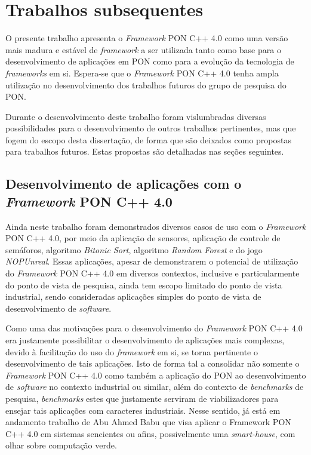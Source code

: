 \section{Trabalhos subsequentes}\label{sec:futuro}

O presente trabalho apresenta o \textit{Framework} PON C++ 4.0 como
uma versão mais madura e estável de \textit{framework} a ser utilizada tanto
como base para o desenvolvimento de aplicações em PON como para a evolução da
tecnologia de \textit{frameworks} em si. Espera-se que o
\textit{Framework} PON C++ 4.0 tenha ampla utilização no
desenvolvimento dos trabalhos futuros do grupo de pesquisa do PON.

Durante o desenvolvimento deste trabalho foram vislumbradas diversas
possibilidades para o desenvolvimento de outros trabalhos pertinentes, mas que
fogem do escopo desta dissertação, de forma que são deixados como propostas para
trabalhos futuros. Estas propostas são detalhadas nas seções seguintes.

\subsection{Desenvolvimento de aplicações com o \textit{Framework} PON C++ 4.0}

Ainda neste trabalho foram demonstrados diversos casos de uso com o
\textit{Framework} PON C++ 4.0, por meio da aplicação de sensores, aplicação de
controle de semáforos, algoritmo \textit{Bitonic Sort}, algoritmo \textit{Random
Forest} e do jogo \textit{NOPUnreal}. Essas aplicações, apesar de demonstrarem o
potencial de utilização do \textit{Framework} PON C++ 4.0 em diversos contextos,
inclusive e particularmente do ponto de vista de pesquisa, ainda tem escopo
limitado do ponto de vista industrial, sendo consideradas aplicações simples do
ponto de vista de desenvolvimento de \textit{software}.

Como uma das motivações para o desenvolvimento do \textit{Framework} PON C++ 4.0
era justamente possibilitar o desenvolvimento de aplicações mais complexas,
devido à facilitação do uso do \textit{framework} em si, se torna pertinente o
desenvolvimento de tais aplicações. Isto de forma tal a consolidar não somente o
\textit{Framework} PON C++ 4.0 como também a aplicação do PON ao desenvolvimento
de \textit{software} no contexto industrial ou similar, além do contexto de
\textit{benchmarks} de pesquisa, \textit{benchmarks} estes que justamente
serviram de viabilizadores para ensejar tais aplicações com caracteres
industriais. Nesse sentido, já está em andamento trabalho de Abu Ahmed Babu que
visa aplicar o Framework PON C++ 4.0 em sistemas sencientes ou afins,
possivelmente uma \textit{smart-house}, com olhar sobre computação verde.

